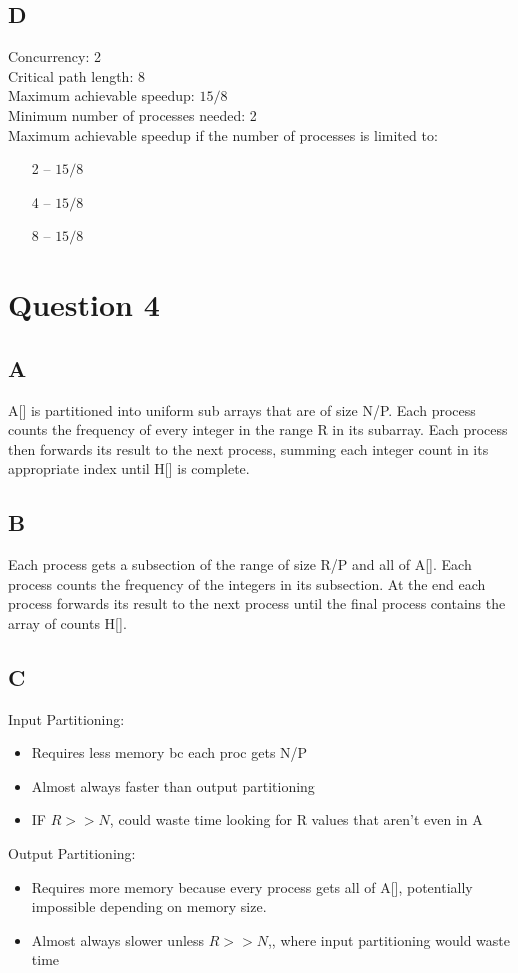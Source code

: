 \documentclass[12pt]{article}
\begin{document}
    \subsection*{D}
    Concurrency: 2\\
    Critical path length: 8\\
    Maximum achievable speedup: \(15/8\)\\
    Minimum number of processes needed: 2\\
    Maximum achievable speedup if the number of processes is limited to:
    \begin{itemize}
        \item[2]-- \(15/8\)
        \item[4]-- \(15/8\)
        \item[8]-- \(15/8\)
    \end{itemize}
     
    \section{Question 4}
     \subsection*{A}
    A[] is partitioned into uniform sub arrays that are of size N/P. Each process counts the frequency of every integer in the range R in its subarray. Each process then forwards its result to the next process, summing each integer count in its appropriate index until H[] is complete.
     \subsection*{B}
    Each process gets a subsection of the range of size R/P and all of A[]. Each process counts the frequency of the integers in its subsection. At the end each process forwards its result to the next process until the final process contains the array of counts H[].
     \subsection*{C}
    Input Partitioning:
    \begin{itemize}
        \item Requires less memory bc each proc gets N/P 
        \item Almost always faster than output partitioning 
        \item IF \(R>>N\), could waste time looking for R values that aren’t even in A
    \end{itemize}
    Output Partitioning:
    \begin{itemize}
        \item Requires more memory because every process gets all of A[], potentially impossible depending on memory size.
        \item Almost always slower unless \(R>>N\),, where input partitioning would waste time
    \end{itemize}
\end{document}
